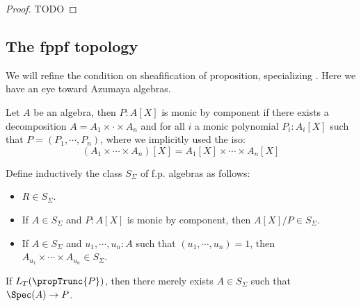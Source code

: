 \begin{proof}
TODO
\end{proof}


\subsection{The fppf topology}

We will refine the condition on sheafification of proposition, specializing . Here we have an eye toward Azumaya algebras.

\begin{definition}
Let $A$ be an algebra, then $P:A[X]$ is monic by component if there exists a decomposition $A=A_1\times\cdot\times A_n$ and for all $i$ a monic polynomial $P_i:A_i[X]$ such that $P = (P_1,\cdots,P_n)$, where we implicitly used the iso:
\[(A_1\times\cdots\times A_n)[X] = A_1[X]\times\cdots\times A_n[X]\]
\end{definition}

\begin{definition}
Define inductively the class $S_\Sigma$ of f.p. algebras as follows:
\begin{itemize}
\item $R\in S_\Sigma$.
\item If $A\in S_\Sigma$ and $P:A[X]$ is monic by component, then $A[X]/P\in S_\Sigma$.
\item If $A\in S_\Sigma$ and $u_1,\cdots,u_n:A$ such that $(u_1,\cdots,u_n)=1$, then $A_{u_1}\times\cdots\times A_{u_n}\in S_\Sigma$.
\end{itemize} 
\end{definition}

\begin{lemma}\label{fppf-sheafifcation-description-SSigma}
If $L_T(\propTrunc{P})$, then there merely exists $A\in S_\Sigma$ such that $\Spec(A)\to P$.
\end{lemma}

